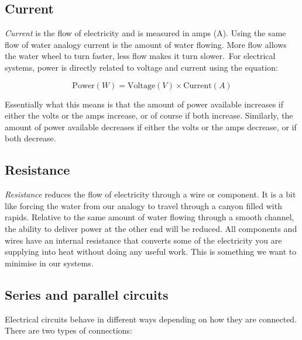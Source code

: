 \documentclass{article}
\theoremstyle{definition}
\theoremstyle{definition}
\theoremstyle{remark}
\begin{document}

  \subsection{Current} %
  \label{sub:current}

    \textit{Current} is the flow of electricity and is measured in amps (A). Using the same flow of water analogy current is the amount of water flowing. More flow allows the water wheel to turn faster, less flow makes it turn slower. For electrical systems, power is directly related to voltage and current using the equation:

    \begin{equation}
      \text{Power} (W) = \text{Voltage} (V) \times \text{Current} (A)
    \end{equation}

    Essentially what this means is that the amount of power available increases if either the volts or the amps increase, or of course if both increase. Similarly, the amount of power available decreases if either the volts or the amps decrease, or if both decrease.
  

  \subsection{Resistance} %
  \label{sub:resistance}

    \textit{Resistance} reduces the flow of electricity through a wire or component. It is a bit like forcing the water from our analogy to travel through a canyon filled with rapids. Relative to the same amount of water flowing through a smooth channel, the ability to deliver power at the other end will be reduced. All components and wires have an internal resistance that converts some of the electricity you are supplying into heat without doing any useful work. This is something we want to minimise in our systems. 
  

  \subsection{Series and parallel circuits} %
  \label{sub:series_and_parallel_circuits}

    Electrical circuits behave in different ways depending on how they are connected. There are two types of connections: 
      
\end{document}
